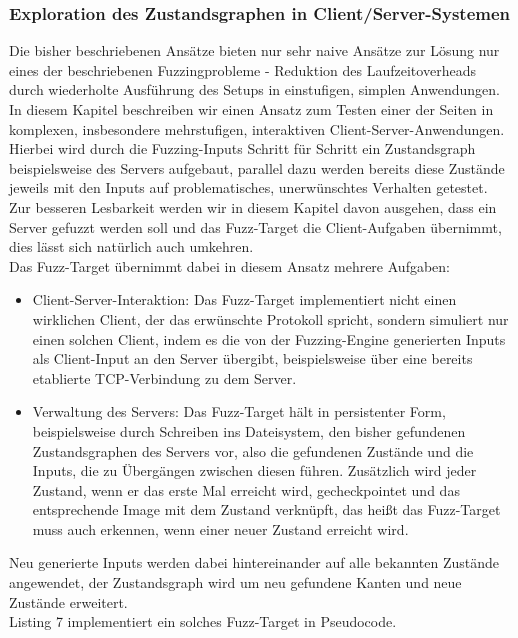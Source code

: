 \documentclass[a4paper]{article}
\begin{document}
\subsubsection{Exploration des Zustandsgraphen in Client/Server-Systemen}
Die bisher beschriebenen Ansätze bieten nur sehr naive Ansätze zur Lösung nur eines der beschriebenen Fuzzingprobleme - Reduktion des Laufzeitoverheads durch wiederholte Ausführung des Setups in einstufigen, simplen Anwendungen. 
In diesem Kapitel beschreiben wir einen Ansatz zum Testen einer der Seiten in komplexen, insbesondere mehrstufigen, interaktiven Client-Server-Anwendungen. 
Hierbei wird durch die Fuzzing-Inputs Schritt für Schritt ein Zustandsgraph beispielsweise des Servers aufgebaut, parallel dazu werden bereits diese Zustände jeweils mit den Inputs auf problematisches, unerwünschtes Verhalten getestet. 
Zur besseren Lesbarkeit werden wir in diesem Kapitel davon ausgehen, dass ein Server gefuzzt werden soll und das Fuzz-Target die Client-Aufgaben übernimmt, dies lässt sich natürlich auch umkehren.\\
Das Fuzz-Target übernimmt dabei in diesem Ansatz mehrere Aufgaben:
\begin{itemize}
    \item Client-Server-Interaktion: Das Fuzz-Target implementiert nicht einen wirklichen Client, der das erwünschte Protokoll spricht, sondern simuliert nur einen solchen Client, indem es die von der Fuzzing-Engine generierten Inputs als Client-Input an den Server übergibt, beispielsweise über eine bereits etablierte TCP-Verbindung zu dem Server.
    \item Verwaltung des Servers: Das Fuzz-Target hält in persistenter Form, beispielsweise durch Schreiben ins Dateisystem, den bisher gefundenen Zustandsgraphen des Servers vor, also die gefundenen Zustände und die Inputs, die zu Übergängen zwischen diesen führen. 
        Zusätzlich wird jeder Zustand, wenn er das erste Mal erreicht wird, gecheckpointet und das entsprechende Image mit dem Zustand verknüpft, das heißt das Fuzz-Target muss auch erkennen, wenn einer neuer Zustand erreicht wird.
\end{itemize}
Neu generierte Inputs werden dabei hintereinander auf alle bekannten Zustände angewendet, der Zustandsgraph wird um neu gefundene Kanten und neue Zustän\-de erweitert.\\
Listing 7 implementiert ein solches Fuzz-Target in Pseudocode.
\end{document}
